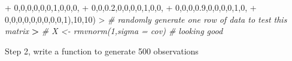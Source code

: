 \documentclass[
]{article}
\newenvironment{Shaded}{\begin{snugshade}}{\end{snugshade}}
\newcommand{\CommentTok}[1]{\textcolor[rgb]{0.56,0.35,0.01}{\textit{#1}}}
\newcommand{\DecValTok}[1]{\textcolor[rgb]{0.00,0.00,0.81}{#1}}
\newcommand{\ErrorTok}[1]{\textcolor[rgb]{0.64,0.00,0.00}{\textbf{#1}}}
\newcommand{\FloatTok}[1]{\textcolor[rgb]{0.00,0.00,0.81}{#1}}
\newcommand{\NormalTok}[1]{#1}
\newcommand{\SpecialCharTok}[1]{\textcolor[rgb]{0.00,0.00,0.00}{#1}}
\begin{document}
\begin{Shaded}
\begin{Highlighting}[]
\SpecialCharTok{+}                \DecValTok{0}\NormalTok{,}\DecValTok{0}\NormalTok{,}\DecValTok{0}\NormalTok{,}\DecValTok{0}\NormalTok{,}\DecValTok{0}\NormalTok{,}\DecValTok{0}\NormalTok{,}\DecValTok{1}\NormalTok{,}\DecValTok{0}\NormalTok{,}\DecValTok{0}\NormalTok{,}\DecValTok{0}\NormalTok{,}
\SpecialCharTok{+}                \DecValTok{0}\NormalTok{,}\DecValTok{0}\NormalTok{,}\FloatTok{0.2}\NormalTok{,}\DecValTok{0}\NormalTok{,}\DecValTok{0}\NormalTok{,}\DecValTok{0}\NormalTok{,}\DecValTok{0}\NormalTok{,}\DecValTok{1}\NormalTok{,}\DecValTok{0}\NormalTok{,}\DecValTok{0}\NormalTok{,}
\SpecialCharTok{+}                \DecValTok{0}\NormalTok{,}\DecValTok{0}\NormalTok{,}\DecValTok{0}\NormalTok{,}\FloatTok{0.9}\NormalTok{,}\DecValTok{0}\NormalTok{,}\DecValTok{0}\NormalTok{,}\DecValTok{0}\NormalTok{,}\DecValTok{0}\NormalTok{,}\DecValTok{1}\NormalTok{,}\DecValTok{0}\NormalTok{,}
\SpecialCharTok{+}                \DecValTok{0}\NormalTok{,}\DecValTok{0}\NormalTok{,}\DecValTok{0}\NormalTok{,}\DecValTok{0}\NormalTok{,}\DecValTok{0}\NormalTok{,}\DecValTok{0}\NormalTok{,}\DecValTok{0}\NormalTok{,}\DecValTok{0}\NormalTok{,}\DecValTok{0}\NormalTok{,}\DecValTok{1}\NormalTok{),}\DecValTok{10}\NormalTok{,}\DecValTok{10}\NormalTok{)}
\SpecialCharTok{\textgreater{}} \CommentTok{\# randomly generate one row of data to test this matrix}
\ErrorTok{\textgreater{}} \CommentTok{\# X \textless{}{-} rmvnorm(1,sigma = cov) \# looking good}
\end{Highlighting}
\end{Shaded}

Step 2, write a function to generate 500 observations
\end{document}
